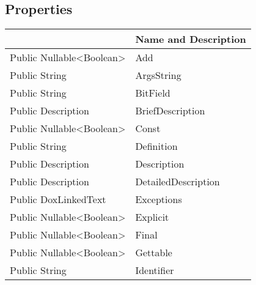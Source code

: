 \documentclass[11pt, oneside, a4paper]{book}
\begin{document}
\subsection{Properties}
\begin{center}
\begin{tabular}{| p{3cm} | p{12cm} | }
\hline
\textbf{ } & \textbf{ Name and Description}\\
\hline
 Public  Nullable<Boolean> &  Add\hypertarget{SoftwareEngineeringTools.{}Documentation.{}DoxEnumValue.{}Add}{}\\
\hline
 Public  String &  ArgsString\hypertarget{SoftwareEngineeringTools.{}Documentation.{}DoxEnumValue.{}ArgsString}{}\\
\hline
 Public  String &  BitField\hypertarget{SoftwareEngineeringTools.{}Documentation.{}DoxEnumValue.{}BitField}{}\\
\hline
 Public  Description &  BriefDescription\hypertarget{SoftwareEngineeringTools.{}Documentation.{}DoxEnumValue.{}BriefDescription}{}\\
\hline
 Public  Nullable<Boolean> &  Const\hypertarget{SoftwareEngineeringTools.{}Documentation.{}DoxEnumValue.{}Const}{}\\
\hline
 Public  String &  Definition\hypertarget{SoftwareEngineeringTools.{}Documentation.{}DoxEnumValue.{}Definition}{}\\
\hline
 Public  Description &  Description\hypertarget{SoftwareEngineeringTools.{}Documentation.{}DoxEnumValue.{}Description}{}\\
\hline
 Public  Description &  DetailedDescription\hypertarget{SoftwareEngineeringTools.{}Documentation.{}DoxEnumValue.{}DetailedDescription}{}\\
\hline
 Public  DoxLinkedText &  Exceptions\hypertarget{SoftwareEngineeringTools.{}Documentation.{}DoxEnumValue.{}Exceptions}{}\\
\hline
 Public  Nullable<Boolean> &  Explicit\hypertarget{SoftwareEngineeringTools.{}Documentation.{}DoxEnumValue.{}Explicit}{}\\
\hline
 Public  Nullable<Boolean> &  Final\hypertarget{SoftwareEngineeringTools.{}Documentation.{}DoxEnumValue.{}Final}{}\\
\hline
 Public  Nullable<Boolean> &  Gettable\hypertarget{SoftwareEngineeringTools.{}Documentation.{}DoxEnumValue.{}Gettable}{}\\
\hline
 Public  String &  Identifier\hypertarget{SoftwareEngineeringTools.{}Documentation.{}DoxEnumValue.{}Identifier}{}\\
\hline

\end{tabular}
\end{center}
\end{document}

